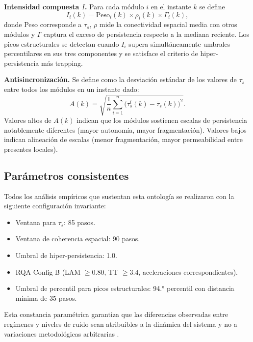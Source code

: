 \textbf{Intensidad compuesta $I$.} Para cada módulo $i$ en el instante $k$ se define
\[
I_i(k) = \text{Peso}_i(k) \times \rho_i(k) \times \Gamma_i(k),
\]
donde Peso corresponde a $\tau_s$, $\rho$ mide la conectividad espacial media con otros módulos y $\Gamma$ captura el exceso de persistencia respecto a la mediana reciente. Los picos estructurales se detectan cuando $I_i$ supera simultáneamente umbrales percentilares en sus tres componentes y se satisface el criterio de hiper-persistencia más trapping.

\textbf{Antisincronización.} Se define como la desviación estándar de los valores de $\tau_s$ entre todos los módulos en un instante dado:
\[
A(k) = \sqrt{\frac{1}{n}\sum_{i=1}^n \bigl(\tau_s^i(k) - \bar{\tau}_s(k)\bigr)^2}.
\]
Valores altos de $A(k)$ indican que los módulos sostienen escalas de persistencia notablemente diferentes (mayor autonomía, mayor fragmentación). Valores bajos indican alineación de escalas (menor fragmentación, mayor permeabilidad entre presentes locales).

\subsection{Parámetros consistentes}

Todos los análisis empíricos que sustentan esta ontología se realizaron con la siguiente configuración invariante:
\begin{itemize}
    \item Ventana para $\tau_s$: 85 pasos.
    \item Ventana de coherencia espacial: 90 pasos.
    \item Umbral de hiper-persistencia: 1.0.
    \item RQA Config B (LAM $\geq 0.80$, TT $\geq 3.4$, aceleraciones correspondientes).
    \item Umbral de percentil para picos estructurales: 94.° percentil con distancia mínima de 35 pasos.
\end{itemize}

Esta constancia paramétrica garantiza que las diferencias observadas entre regímenes y niveles de ruido sean atribuibles a la dinámica del sistema y no a variaciones metodológicas arbitrarias \citep{padilla_rqa_integration_2026,padilla_feigenbaum_theorem_2026}.